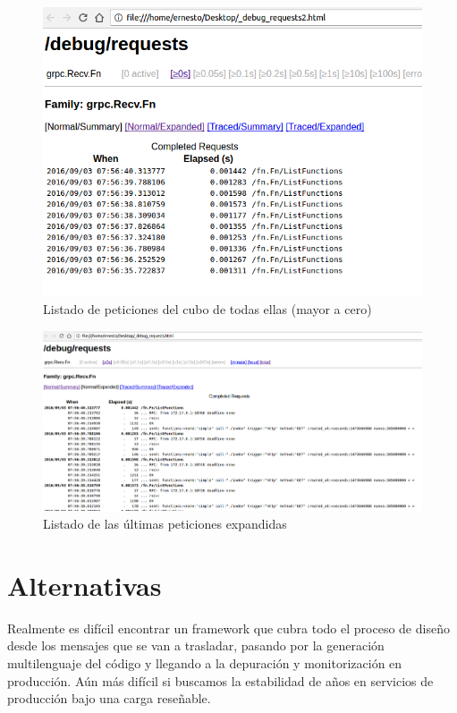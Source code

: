 \begin{figure}[H]
    \centering
    \includegraphics[width=\textwidth]{../images/trace/requests.png}
    \caption{Listado de peticiones del cubo de todas ellas (mayor a cero)}
    \label{fig:trace-requests}
\end{figure}

\begin{figure}[H]
    \centering
    \includegraphics[width=\textwidth]{../images/trace/expanded.png}
    \caption{Listado de las últimas peticiones expandidas}
    \label{fig:trace-expanded}
\end{figure}

\section{Alternativas}
\label{sec:grpc-alternatives}

Realmente es difícil encontrar un framework que cubra todo el proceso de diseño desde los mensajes que se van a trasladar, pasando por la generación multilenguaje del código y llegando a la depuración y monitorización en producción. Aún más difícil si buscamos la estabilidad de años en servicios de producción bajo una carga reseñable.

